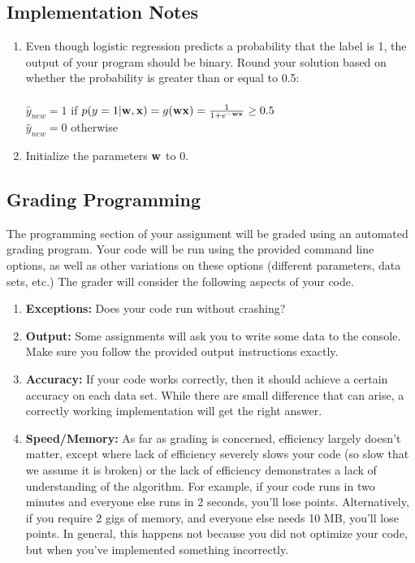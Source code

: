 \documentclass[11pt]{article}
\newcommand{\vw}{{\bf w}}
\newcommand{\vx}{{\bf x}}
\begin{document}
\subsection{Implementation Notes}
\begin{enumerate}[1.]
\item
Even though logistic regression predicts a probability that the label is 1, the output of your program should be binary. Round your solution based on whether the probability is greater than or equal to 0.5:\\
\\
$\hat{y}_{new} = 1$ if $p(y = 1 | \vw, \vx) = g(\vw \vx) = \frac{1}{1 + e^{-\vw \vx}} \ge 0.5$\\
$\hat{y}_{new} = 0$ otherwise\\

\item
Initialize the parameters $\vw$ to $0$.

\end{enumerate}

\subsection{Grading Programming}
	The programming section of your assignment will be graded using an automated grading program. Your code will be run using
	the provided command line options, as well as other variations on these options (different parameters, data sets, etc.) The grader will consider the following aspects of your code.
	\begin{enumerate}
		\item {\bf Exceptions:} Does your code run without crashing?
		\item {\bf Output:} Some assignments will ask you to write some data to the console. Make sure you follow the provided output instructions exactly.
		\item {\bf Accuracy:} If your code works correctly, then it should achieve a certain accuracy on each data set. While there are small difference that can arise, a correctly working implementation will get the right answer.
		\item {\bf Speed/Memory:} As far as grading is concerned, efficiency largely doesn't matter, except where lack of efficiency severely slows your code (so slow that we assume it is broken) or the lack of efficiency demonstrates a lack of understanding of the algorithm.  For example, if your code runs in two minutes and everyone else runs in 2 seconds, you'll lose points. Alternatively, if you require 2 gigs of memory, and everyone else needs 10 MB, you'll lose points. In general, this happens not because you did not optimize your code, but when you've implemented something incorrectly.
	\end{enumerate}
	
\end{document}
